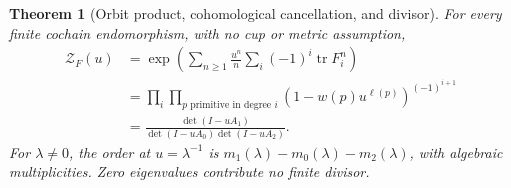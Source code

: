 \documentclass[11pt,a4paper]{article}
\newtheorem{theorem}[definition]{Theorem}
\theoremstyle{remark}\newtheorem{remark}[definition]{Remark}
\newcommand{\tr}{\operatorname{tr}}\newcommand{\im}{\operatorname{im}}
\begin{document}
\begin{theorem}[Orbit product, cohomological cancellation, and divisor]\label{thm:cancellation}
For every finite cochain endomorphism, with no cup or metric assumption,
\begin{align}
\mathcal Z_F(u)
&=\exp\left(\sum_{n\ge1}\frac{u^n}{n}\sum_i(-1)^i\tr F_i^n\right)\label{eq:trace}\tag{3.2}\\
&=\prod_i\prod_{p\text{ primitive in degree }i}
(1-w(p)u^{\ell(p)})^{(-1)^{i+1}}\label{eq:orbit}\tag{3.3}\\
&=\frac{\det(I-uA_1)}{\det(I-uA_0)\det(I-uA_2)}.\label{eq:cohom-zeta}\tag{3.4}
\end{align}
For $\lambda\ne0$, the order at $u=\lambda^{-1}$ is $m_1(\lambda)-m_0(\lambda)-m_2(\lambda)$, with algebraic multiplicities. Zero eigenvalues contribute no finite divisor.
\end{theorem}
\end{document}
